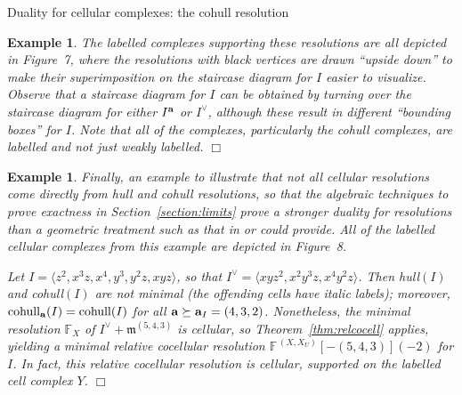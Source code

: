 \documentclass[12pt,leqno]{article}
\newtheorem{example}[thm]{Example}
\def\<{{\langle}}
\def\>{{\rangle}}
\def\aa{{{\rm \bf a}}}
\def\mm{{\mathfrak m}}
\def\FF{{\mathbb F}}
\begin{document}
\begin{section}{Duality for cellular complexes: the cohull resolution}
\begin{example}
The labelled complexes supporting these resolutions are all depicted in
Figure~7, where the resolutions with black vertices are drawn ``upside
down'' to make their superimposition on the staircase diagram for $I$
easier to visualize.  Observe that a staircase diagram for $I$ can be
obtained by turning over the staircase diagram for either $I^\aa$ or
$I^\vee$, although these result in different ``bounding boxes'' for $I$.
Note that all of the complexes, particularly the cohull complexes, are
labelled and not just weakly labelled.  \hfill $\Box$
\end{example}
\begin{example} \rm
Finally, an example to illustrate that not all cellular resolutions come
directly from hull and cohull resolutions, so that the algebraic
techniques to prove exactness in Section~\ref{section:limits} prove a
stronger duality for resolutions than a geometric treatment such as that
in \cite{BS} or \cite{Stu} could provide.  All of the labelled cellular
complexes from this example are depicted in Figure~8.

Let $I = \<z^2,x^3z,x^4,y^3,y^2z,xyz\>$, so that $I^\vee =
\<xyz^2,x^2y^3z,x^4y^2z\>$.  Then hull$(I)$ and cohull$(I)$ are not
minimal (the offending cells have italic labels); moreover, ${\rm
cohull}_\aa(I) = {\rm cohull}(I)$ for all $\aa \succeq \aa_I = (4,3,2)$.
Nonetheless, the minimal resolution $\FF_X$ of $I^\vee + \mm^{(5,4,3)}$
is cellular, so Theorem~\ref{thm:relcocell} applies, yielding a minimal
relative cocellular resolution $\FF^{\,(X,X_U)}[-(5,4,3)](-2)$ for $I$.
In fact, this relative cocellular resolution is cellular, supported on the
labelled cell complex $Y$.  \hfill $\Box$
\end{example}


\end{section}%
\end{document}
